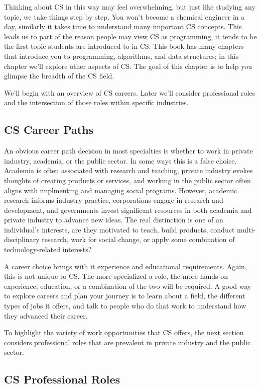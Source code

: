 Thinking about CS in this way may feel overwhelming, but just like studying any topic, we take things step by step. You won't become a chemical engineer in a day, similarly it takes time to understand many important CS concepts. This leads us to part of the reason people may view CS as programming, it tends to be the first topic students are introduced to in CS. This book has many chapters that introduce you to programming, algorithms, and data structures; in this chapter we'll explore other aspects of CS. The goal of this chapter is to help you glimpse the breadth of the CS field.

We'll begin with an overview of CS careers. Later we'll consider professional roles and the intersection of those roles within specific industries.

\subsection{CS Career Paths}

An obvious career path decision in most specialties is whether to work in private industry, academia, or the public sector. In some ways this is a false choice. Academia is often associated with research and teaching, private industry evokes thoughts of creating products or services, and working in the public sector often aligns with implmenting and managing social programs. However, academic research informs industry practice, corporations engage in research and development, and governments invest significant resources in both academia and private industry to advance new ideas. The real distinction is one of an individual's interests, are they motivated to teach, build products, conduct multi-disciplinary research, work for social change, or apply some combination of technology-related interests?

A career choice brings with it experience and educational requirements. Again, this is not unique to CS. The more specialized a role, the more hands-on experience, education, or a combination of the two will be required. A good way to explore careers and plan your journey is to learn about a field, the different types of jobs it offers, and talk to people who do that work to understand how they advanced their career. 

To highlight the variety of work opportunities that CS offers, the next section considers professional roles that are prevalent in private industry and the public sector. 

\subsection{CS Professional Roles}

